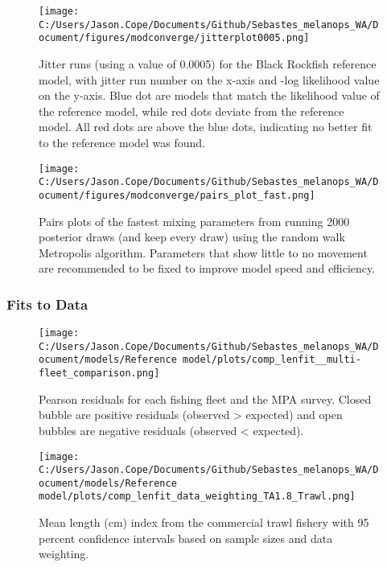 \documentclass[11pt,
  english,
  letterpaper,
]{article}
\begin{document}
\begin{figure}
\centering
\texttt{[image: C:/Users/Jason.Cope/Documents/Github/Sebastes\_melanops\_WA/Document/figures/modconverge/jitterplot0005.png]}
\caption{Jitter runs (using a value of 0.0005) for the Black Rockfish reference model, with jitter run number on the x-axis and -log likelihood value on the y-axis. Blue dot are models that match the likelihood value of the reference model, while red dots deviate from the reference model. All red dots are above the blue dots, indicating no better fit to the reference model was found.\label{fig:jitter0005}}
\end{figure}

\begin{figure}
\centering
\texttt{[image: C:/Users/Jason.Cope/Documents/Github/Sebastes\_melanops\_WA/Document/figures/modconverge/pairs\_plot\_fast.png]}
\caption{Pairs plots of the fastest mixing parameters from running 2000 posterior draws (and keep every draw) using the random walk Metropolis algorithm. Parameters that show little to no movement are recommended to be fixed to improve model speed and efficiency.\label{fig:pairs_plot_fast}}
\end{figure}

\clearpage

\hypertarget{fits-to-data}{%
\subsubsection{Fits to Data}\label{fits-to-data}}

\begin{figure}
\centering
\texttt{[image: C:/Users/Jason.Cope/Documents/Github/Sebastes\_melanops\_WA/Document/models/Reference model/plots/comp\_lenfit\_\_multi-fleet\_comparison.png]}
\caption{Pearson residuals for each fishing fleet and the MPA survey. Closed bubble are positive residuals (observed \textgreater{} expected) and open bubbles are negative residuals (observed \textless{} expected).\label{fig:lt-pearson-resids}}
\end{figure}

\pagebreak

\begin{figure}
\centering
\texttt{[image: C:/Users/Jason.Cope/Documents/Github/Sebastes\_melanops\_WA/Document/models/Reference model/plots/comp\_lenfit\_data\_weighting\_TA1.8\_Trawl.png]}
\caption{Mean length (cm) index from the commercial trawl fishery with 95 percent confidence intervals based on sample sizes and data weighting.\label{fig:trawl-mean-len-fit}}
\end{figure}
\end{document}
